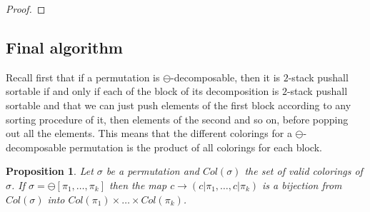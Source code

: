 \documentclass[11pt]{article}
\newtheorem{prop}[thm]{Proposition}
\newcommand{\pushall}{$2$-stack pushall sortable\xspace}
\newcounter{indice}
\newcommand{\permutation}[1]{
\setcounter{indice}{0};
\foreach \i in {#1} 
\addtocounter{indice}{1};

\addtocounter{indice}{1}
\draw [help lines] (1,1) grid (\theindice,\theindice);

\setcounter{indice}{1};

\foreach \i in { #1 } {
\draw (\theindice+.5,\i+.5) [fill] circle (.2);
\addtocounter{indice}{1};
}
\addtocounter{indice}{-1};
}
\begin{document}
\begin{proof}
\hfill
{}
\end{proof}



\subsection{Final algorithm}

Recall first that if a permutation is $\ominus$-decomposable, then it is \pushall if and only if 
each of the block of its decomposition is \pushall and that we can just push elements of the first block according to any sorting procedure of it, then elements of the second and so on, before popping out all the elements. 
This means that the different colorings for a $\ominus$-decomposable permutation is the product of all colorings for each block.

\begin{prop}\label{prop:Col=cartesianProduct}
Let $\sigma$ be a permutation and $Col(\sigma)$ the set of valid colorings of $\sigma$.
If $\sigma = \ominus[\pi_1, \dots ,\pi_k]$ then the map $c \rightarrow (c|\pi_1, \dots, c|\pi_k)$
is a bijection from $Col(\sigma)$ into $Col(\pi_1) \times \dots \times Col(\pi_k)$.
\end{prop}
\end{document}
